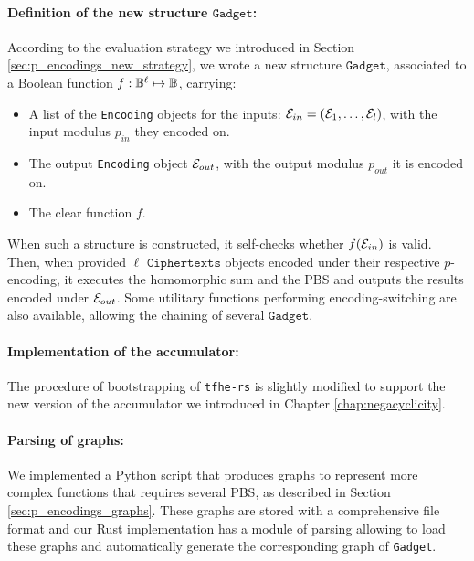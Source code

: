 \paragraph{Definition of the new structure $\texttt{Gadget}$: } According to the evaluation strategy we introduced in Section \ref{sec:p_encodings_new_strategy}, we wrote a new structure $\texttt{Gadget}$, associated to a Boolean function $f: \mathbb{B}^\ell \mapsto \mathbb{B}$, carrying:
\begin{itemize}
    \item A list of the \texttt{Encoding} objects for the inputs: $\mathcal{E}_{in} = (\mathcal{E}_1, \dots, \mathcal{E}_l)$, with the input modulus $p_{in}$ they encoded on.
    \item The output \texttt{Encoding} object $\mathcal{E}_{out}$, with the output modulus $p_{out}$ it is encoded on.
    \item The clear function $f$.
\end{itemize}
When such a structure is constructed, it self-checks whether $f(\mathcal{E}_{in})$ is valid. Then, when provided $\ell$ $\texttt{Ciphertexts}$ objects encoded under their respective $p$-encoding, it executes the homomorphic sum and the PBS and outputs the results encoded under $\mathcal{E}_{out}$. Some utilitary functions performing encoding-switching are also available, allowing the chaining of several $\texttt{Gadget}$.


\paragraph{Implementation of the accumulator: } The procedure of bootstrapping of \texttt{tfhe-rs} is slightly modified to support the new version of the accumulator we introduced in Chapter \ref{chap:negacyclicity}.

\paragraph{Parsing of graphs: } We implemented a Python script that produces graphs to represent more complex functions that requires several PBS, as described in Section \ref{sec:p_encodings_graphs}. These graphs are stored with a comprehensive file format and our Rust implementation has a module of parsing allowing to load these graphs and automatically generate the corresponding graph of \texttt{Gadget}.



